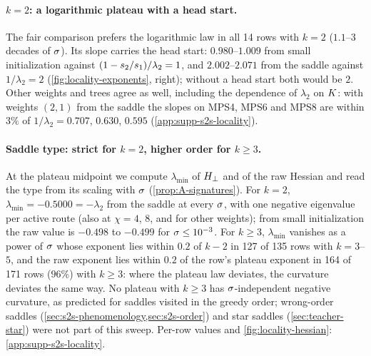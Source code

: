 \paragraph{$k=2$: a logarithmic plateau with a head start.}
\empirical{} The fair comparison prefers the logarithmic law in all 14 rows with $k=2$ ($1.1$--$3$ decades of
$\sigma$). Its slope carries the head start: $0.980$--$1.009$ from small initialization against
$(1-s_{2}/s_{1})/\lambda_2=1$, and $2.002$--$2.071$ from the saddle against $1/\lambda_2=2$
(\cref{fig:locality-exponents}, right); without a head start both would be $2$. Other weights and trees agree as
well, including the dependence of $\lambda_2$ on $K$: with weights $(2,1)$ from the saddle the slopes on MPS4,
MPS6 and MPS8 are within $3\%$ of $1/\lambda_2=0.707$, $0.630$, $0.595$ (\cref{app:supp-s2s-locality}).
 

\paragraph{Saddle type: strict for $k=2$, higher order for $k\ge3$.}
\empirical{} At the plateau midpoint we compute $\lambda_{\min}$ of $H_{\perp}$ and of the raw Hessian and read the
type from its scaling with $\sigma$ (\cref{prop:A-signatures}). For $k=2$, $\lambda_{\min}=-0.5000=-\lambda_2$ from
the saddle at every $\sigma$, with one negative eigenvalue per active route (also at $\chi=4$, $8$, and for other
weights); from small initialization the raw value is $-0.498$ to $-0.499$ for $\sigma\le10^{-3}$. For $k\ge3$,
$\lambda_{\min}$ vanishes as a power of $\sigma$ whose exponent lies within $0.2$ of $k-2$ in 127 of 135 rows with
$k=3$--$5$, and the raw exponent lies within $0.2$ of the row's plateau exponent in 164 of 171 rows ($96\%$) with $k\ge3$: where the plateau law
deviates, the curvature deviates the same way. No plateau with $k\ge3$ has $\sigma$-independent negative curvature,
as predicted for saddles visited in the greedy order; wrong-order saddles
(\cref{sec:s2s-phenomenology,sec:s2s-order}) and star saddles (\cref{sec:teacher-star}) were not part of this
sweep. Per-row values and \cref{fig:locality-hessian}: \cref{app:supp-s2s-locality}. 

